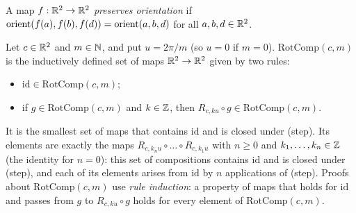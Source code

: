 \begin{definition}\label{oc:def:preserves}
A map $f:\mathbb R^2\to\mathbb R^2$ \emph{preserves orientation} if $\operatorname{orient}(f(a),f(b),f(d))=\operatorname{orient}(a,b,d)$ for all
$a,b,d\in\mathbb R^2$.
\end{definition}

\begin{definition}\label{oc:def:rotcomp}
Let $c\in\mathbb R^2$ and $m\in\mathbb N$, and put $u=2\pi/m$ (so $u=0$ if $m=0$). $\mathrm{RotComp}(c,m)$ is the
inductively defined set of maps $\mathbb R^2\to\mathbb R^2$ given by two rules:
\begin{itemize}
\item[(id)] $\mathrm{id}\in\mathrm{RotComp}(c,m)$;
\item[(step)] if $g\in\mathrm{RotComp}(c,m)$ and $k\in\mathbb Z$, then $R_{c,ku}\circ g\in\mathrm{RotComp}(c,m)$.
\end{itemize}
It is the smallest set of maps that contains $\mathrm{id}$ and is closed under (step). Its elements are
exactly the maps $R_{c,k_nu}\circ\dots\circ R_{c,k_1u}$ with $n\ge0$ and $k_1,\dots,k_n\in\mathbb Z$ (the
identity for $n=0$): this set of compositions contains $\mathrm{id}$ and is closed under (step), and each
of its elements arises from $\mathrm{id}$ by $n$ applications of (step). Proofs about
$\mathrm{RotComp}(c,m)$ use \emph{rule induction}: a property of maps that holds for $\mathrm{id}$ and
passes from $g$ to $R_{c,ku}\circ g$ holds for every element of $\mathrm{RotComp}(c,m)$.
\end{definition}

